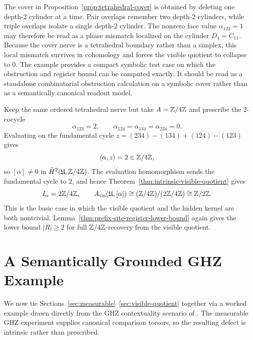 \begin{example}
\label{ex:tetrahedral-cover}
The cover in Proposition~\ref{prop:tetrahedral-cover} is obtained by deleting
one depth-$2$ cylinder at a time.  Pair overlaps remember two depth-$2$
cylinders, while triple overlaps isolate a single depth-$2$ cylinder.  The
nonzero face value $\alpha_{123}=1$ may therefore be read as a phase mismatch
localized on the cylinder $D_4=C_{11}$.  Because the cover nerve is a
tetrahedral boundary rather than a simplex, this local mismatch survives in
cohomology and forces the visible quotient to collapse to $0$.  The example
provides a compact symbolic test case on which the obstruction and register
bound can be computed exactly.  It should be read as a standalone combinatorial
obstruction calculation on a symbolic cover rather than as a semantically
canonical readout model.
\end{example}

\begin{example}
\label{ex:tetrahedral-z4}
Keep the same ordered tetrahedral nerve but take $A=\mathbb{Z}/4\mathbb{Z}$ and prescribe
the $2$-cocycle
\[
\alpha_{123}=2,
\qquad
\alpha_{124}=\alpha_{134}=\alpha_{234}=0.
\]
Evaluating on the fundamental cycle
$z=(234)-(134)+(124)-(123)$ gives
\[
\langle \alpha,z\rangle = 2\in \mathbb{Z}/4\mathbb{Z},
\]
so $[\alpha]\neq 0$ in $\check{H}^2(\mathfrak{U},\mathbb{Z}/4\mathbb{Z})$.  The evaluation
homomorphism sends the fundamental cycle to $2$, and hence
Theorem~\ref{thm:intrinsic-visible-quotient} gives
\[
I_\alpha=2\mathbb{Z}/4\mathbb{Z},
\qquad
A_{\mathrm{vis}}(\mathfrak{U},[\alpha])\cong (\mathbb{Z}/4\mathbb{Z})/(2\mathbb{Z}/4\mathbb{Z})\cong \mathbb{Z}/2\mathbb{Z}.
\]
This is the basic case in which the visible quotient and the hidden kernel are
both nontrivial.  Lemma~\ref{thm:prefix-site-register-lower-bound} again gives
the lower bound $|R|\ge 2$ for full $\mathbb{Z}/4\mathbb{Z}$-recovery from the visible
quotient.
\end{example}

\section{A Semantically Grounded GHZ Example}
\label{sec:semantic-example}

We now tie Sections~\ref{sec:measurable}--\ref{sec:visible-quotient} together
via a worked example drawn directly from the GHZ contextuality scenario of
\cite{AbramskyBrandenburger2011,AbramskyEtAl2015ContextualityCohomologyParadox}.
The measurable GHZ experiment supplies canonical comparison torsors, so the
resulting defect is intrinsic rather than prescribed.

